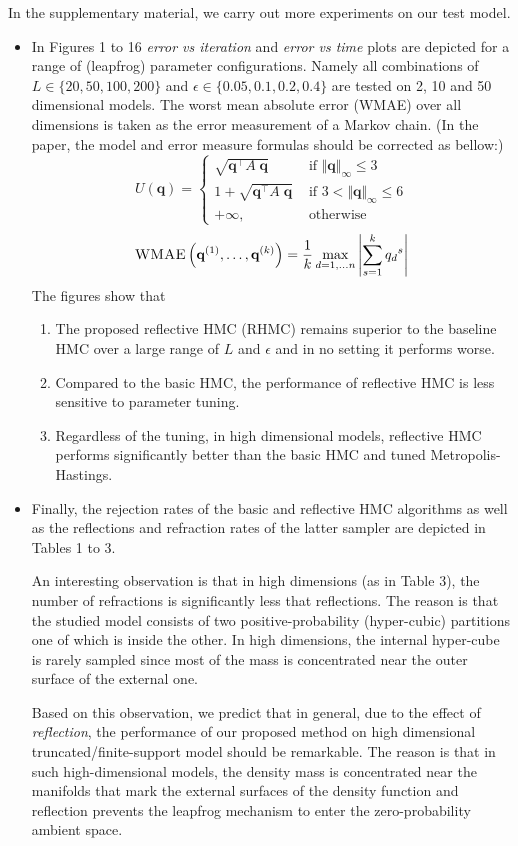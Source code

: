 \documentclass{article} %
\newcommand{\bvec}[1]{\textbf{#1}}
\newcommand{\case}[2]{#2 &\text{ if } #1}%
\newcommand{\otherwise}[1]{#1 &\text{ otherwise}}
\begin{document}
In the supplementary material, we carry out more experiments on our test model.
\begin{itemize}
\item In Figures 1 to 16 \emph{error vs iteration} and \emph{error vs time} plots are depicted for a range of (leapfrog) parameter configurations. Namely all combinations of $L \in \{20, 50, 100, 200\}$ and $\epsilon \in \{0.05, 0.1, 0.2, 0.4\}$ are tested on 2, 10 and 50 dimensional models. 
The worst mean absolute error (WMAE) over all dimensions is taken as the error measurement of a Markov chain. (In the paper, the model and error measure formulas should be corrected as bellow:)
\[
U(\bvec{q}) =
\begin{cases}
\case{\Vert \bvec{q} \Vert_\infty \leq 3}{\sqrt{\bvec{q}^\top A \; \bvec{q}}}\\
\case{3 < \Vert \bvec{q} \Vert_\infty \leq 6 }{1 + \sqrt{\bvec{q}^\top A \; \bvec{q}}}\\
\otherwise{+ \infty,}
\end{cases}
\] 
\[
\textsc{WMAE} \left( \bvec{q}^{(1)}, \ldots, \bvec{q}^{(k)} \right) = 
\frac{1}{k}
\max_{d=1, \ldots n} 
\left|\sum_{s=1}^k {q_d}^{s} \right|
\]
The figures show that 
\begin{enumerate}
\item 
The proposed reflective HMC (RHMC) remains superior to the baseline HMC over a large range of $L$ and $\epsilon$ and in no setting it performs worse.
\item Compared to the basic HMC, the performance of reflective HMC is less sensitive to parameter tuning.
\item Regardless of the tuning, in high dimensional models, reflective HMC performs significantly better than the basic HMC and tuned Metropolis-Hastings.
 \end{enumerate}
\item Finally, the rejection rates of the basic and reflective HMC algorithms as well as the reflections and refraction rates of the latter sampler are depicted in Tables 1 to 3. 

An interesting observation is that in high dimensions (as in Table 3), the number of refractions is significantly less that reflections. 
The reason is that the studied model consists of  two positive-probability (hyper-cubic) partitions one of which is inside the other. In high dimensions, the internal hyper-cube is rarely sampled since most of the mass is concentrated near the outer surface of the external one. 

Based on this observation, we predict that in general, due to the effect of \emph{reflection}, the performance of our proposed method on high dimensional truncated/finite-support model should be remarkable.
The reason is that in such high-dimensional models, the density mass is concentrated near the manifolds that mark the external surfaces of the density function and reflection prevents the leapfrog mechanism to enter the zero-probability ambient space. 
\end{itemize}
\end{document}
